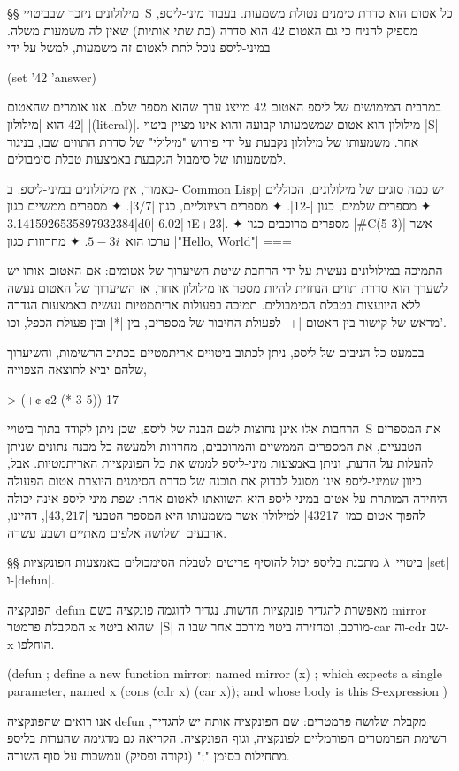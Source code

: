 §§ מילולונים
ניזכר שבביטויי~S כל אטום הוא סדרת סימנים נטולת משמעות. בעבור מיני-ליספ,
מספיק להניח כי גם האטום 42 הוא סדרה (בת שתי אותיות) שאין לה משמעות משלה.
במיני-ליספ נוכל לתת לאטום זה משמעות, למשל על ידי
\begin{LISP}
(set '42 'answer)
\end{LISP}
במרבית המימושים של ליספ האטום 42 מייצג ערך שהוא מספר
שלם. אנו אומרים שהאטום 42 הוא \ע|מילולון| \E|(literal)|. מילולון הוא
אטום שמשמעותו קבועה והוא אינו מציין ביטוי \E|S| אחר. משמעותו של מילולון
נקבעת על ידי פירוש "מילולי" של סדרת התווים שבו, בניגוד למשמעותו של סימבול
הנקבעת באמצעות טבלת סימבולים.

כאמור, אין מילולונים במיני-ליספ. ב-\E|Common Lisp| יש כמה סוגים של מילולונים,
הכוללים
✦ מספרים שלמים, כגון \T|-12|.
✦ מספרים רציונליים, כגון \T|3/7|.
✦ מספרים ממשיים כגון \T|3.1415926535897932384d0| ו-\T|6.02E+23|.
✦ מספרים מרוכבים כגון \T|#C(5-3)| אשר ערכו הוא~$5-3i$.
✦ מחרוזות כגון \T|"Hello, World"|
===

התמיכה במילולונים נעשית על ידי הרחבת שיטת השיערוך של אטומים: אם האטום אותו יש
לשערך הוא סדרת תווים הנחזית להיות מספר או מילולון אחר, אז השיערוך של האטום נעשה
ללא היוועצות בטבלת הסימבולים. תמיכה בפעולות אריתמטיות נעשית באמצעות הגדרה מראש
של קישור בין האטום \T|+| לפעולת החיבור של מספרים, בין \T|*| ובין פעולת הכפל,
וכו'.

בכמעט כל הניבים של ליספ, ניתן לכתוב ביטויים אריתמטיים בכתיב הרשימות, והשיערוך
שלהם יביא לתוצאה הצפוייה,

\begin{LISP}
> (+¢ ¢2 (* 3 5))
17
\end{LISP}

הרחבות אלו אינן נחוצות לשם הבנה של ליספ, שכן ניתן לקודד בתוך ביטויי~S את
המספרים הטבעיים, את המספרים הממשיים והמרוכבים, מחרוזות ולמעשה כל מבנה נתונים
שניתן להעלות על הדעת, וניתן באמצעות מיני-ליספ לממש את כל הפונקציות האריתמטיות.
אבל, כיוון שמיני-ליספ אינו מסוגל לבדוק את תוכנה של סדרת הסימנים היוצרת אטום
הפעולה היחידה המותרת על אטום במיני-ליספ היא השוואתו לאטום אחר: שפת מיני-ליספ
אינה יכולה להפוך אטום כמו \T|43217| למילולון אשר משמעותו היא המספר הטבעי
\E|$43,217$|, דהיינו, ארבעים ושלושה אלפים מאתיים ושבע עשרה.

§§ ביטויי~$λ$
מתכנת בליספ יכול להוסיף פריטים לטבלת הסימבולים באמצעות הפונקציות \E|set|
ו-\E|defun|.

הפונקציה defun מאפשרת להגדיר פונקציות חדשות. נגדיר לדוגמה פונקציה בשם mirror
המקבלת פרמטר x שהוא ביטוי~\E|S| מורכב, ומחזירה ביטוי מורכב אחר שבו ה-car וה-cdr
שב-x הוחלפו.
\begin{LISP}
(defun ; define a new function
  mirror; named mirror
  (x) ; which expects a single parameter, named x
  (cons (cdr x) (car x)); and whose body is this S-expression
)
\end{LISP}
אנו רואים שהפונקציה defun מקבלת שלושה פרמטרים: שם הפונקציה אותה יש להגדיר,
רשימת הפרמטרים הפורמליים לפונקציה, וגוף הפונקציה. הקריאה גם מדגימה שהערות בליספ
מתחילות בסימן ";" (נקודה ופסיק) ונמשכות על סוף השורה.

